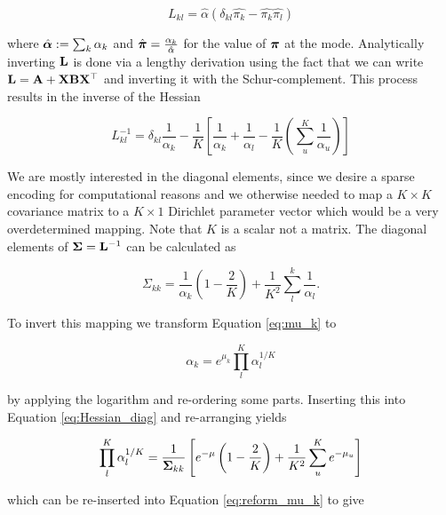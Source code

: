\begin{equation}
L_{kl} = \hat{\alpha}(\delta_{kl}\hat{\pi_k} - \hat{\pi_k} \hat{\pi_l})
\end{equation}

where $\hat{{\boldsymbol{\alpha}}} := \sum_k \alpha_k$ and $\hat{\boldsymbol{\pi}} = \frac{\alpha_k}{\hat{\alpha}}$ for the value
of $\boldsymbol{\pi}$ at the mode. Analytically inverting ${\mathbf{L}}$ is done via a lengthy derivation using the fact that we can write ${\mathbf{L}} = {\mathbf{A}} + {\mathbf{X}}{\mathbf{B}}{\mathbf{X}}^\top$ and inverting it with the Schur-complement. This process results in the inverse of the Hessian


\begin{equation}
L_{kl}^{-1} = \delta_{kl} \frac{1}{\alpha_k} - \frac{1}{K} \left[\frac{1}{\alpha_k} + \frac{1}{\alpha_l} - \frac{1}{K}\left(\sum_u^K \frac{1}{\alpha_u}\right) \right]
\end{equation}

We are mostly interested in the diagonal elements, since we desire a sparse encoding for computational reasons and we otherwise needed to map a $K \times K$ covariance matrix to a $K\times 1$ Dirichlet parameter vector which would be a very overdetermined mapping. Note that $K$ is a scalar not a matrix. The diagonal elements of ${\boldsymbol{\Sigma}} = {\mathbf{L}}^{-1}$ can be calculated as

\begin{equation}
\label{eq:Hessian_diag}
\Sigma_{kk} = \frac{1}{\alpha_k} \left(1 - \frac{2}{K}\right)  + \frac{1}{K^2} \sum_{l}^{k} \frac{1}{\alpha_l}.
\end{equation}

To invert this mapping we transform Equation \ref{eq:mu_k} to 

\begin{equation}
\label{eq:reform_mu_k}
\alpha_k = e^{\mu_k} \prod_l^{K} \alpha_l^{1/K}
\end{equation}

by applying the logarithm and re-ordering some parts. Inserting this into Equation \ref{eq:Hessian_diag} and re-arranging yields

\begin{equation}
\prod_l^K \alpha_l^{1/K} = \frac{1}{{\boldsymbol{\Sigma}}_{kk}} \left[e^{-\mu}\left(1 - \frac{2}{K}\right)  + \frac{1}{K^2} \sum_u^K e^{-\mu_u} \right]
\end{equation}

which can be re-inserted into Equation \ref{eq:reform_mu_k} to give

